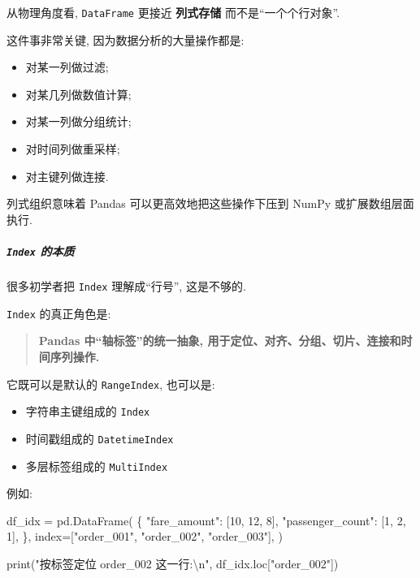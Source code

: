 \documentclass[11pt]{article}
\providecommand{\tightlist}{%
      \setlength{\itemsep}{0pt}\setlength{\parskip}{0pt}}
\newenvironment{Shaded}{}{}
\newcommand{\DecValTok}[1]{\textcolor[rgb]{0.25,0.63,0.44}{{#1}}}
\newcommand{\CharTok}[1]{\textcolor[rgb]{0.25,0.44,0.63}{{#1}}}
\newcommand{\StringTok}[1]{\textcolor[rgb]{0.25,0.44,0.63}{{#1}}}
\newcommand{\NormalTok}[1]{{#1}}
\newcommand{\OperatorTok}[1]{\textcolor[rgb]{0.40,0.40,0.40}{{#1}}}
\newcommand{\BuiltInTok}[1]{{#1}}
\begin{document}
从物理角度看, \texttt{DataFrame} 更接近 \textbf{列式存储}
而不是``一个个行对象''.

这件事非常关键, 因为数据分析的大量操作都是:

\begin{itemize}
\tightlist
\item
  对某一列做过滤;
\item
  对某几列做数值计算;
\item
  对某一列做分组统计;
\item
  对时间列做重采样;
\item
  对主键列做连接.
\end{itemize}

列式组织意味着 Pandas 可以更高效地把这些操作下压到 NumPy
或扩展数组层面执行.

    \subparagraph{\texorpdfstring{\texttt{Index}
的本质}{Index 的本质}}\label{index-ux7684ux672cux8d28}

    很多初学者把 \texttt{Index} 理解成``行号'', 这是不够的.

\texttt{Index} 的真正角色是:

\begin{quote}
\textbf{Pandas 中``轴标签''的统一抽象,
用于定位、对齐、分组、切片、连接和时间序列操作.}
\end{quote}

它既可以是默认的 \texttt{RangeIndex}, 也可以是:

\begin{itemize}
\tightlist
\item
  字符串主键组成的 \texttt{Index}
\item
  时间戳组成的 \texttt{DatetimeIndex}
\item
  多层标签组成的 \texttt{MultiIndex}
\end{itemize}

例如:

\begin{Shaded}
\begin{Highlighting}[]
\NormalTok{df\_idx }\OperatorTok{=}\NormalTok{ pd.DataFrame(}
\NormalTok{    \{}
        \StringTok{"fare\_amount"}\NormalTok{: [}\DecValTok{10}\NormalTok{, }\DecValTok{12}\NormalTok{, }\DecValTok{8}\NormalTok{],}
        \StringTok{"passenger\_count"}\NormalTok{: [}\DecValTok{1}\NormalTok{, }\DecValTok{2}\NormalTok{, }\DecValTok{1}\NormalTok{],}
\NormalTok{    \},}
\NormalTok{    index}\OperatorTok{=}\NormalTok{[}\StringTok{"order\_001"}\NormalTok{, }\StringTok{"order\_002"}\NormalTok{, }\StringTok{"order\_003"}\NormalTok{],}
\NormalTok{)}

\BuiltInTok{print}\NormalTok{(}\StringTok{"按标签定位 order\_002 这一行:}\CharTok{\textbackslash{}n}\StringTok{"}\NormalTok{, df\_idx.loc[}\StringTok{"order\_002"}\NormalTok{])}
\end{Highlighting}
\end{Shaded}
\end{document}

